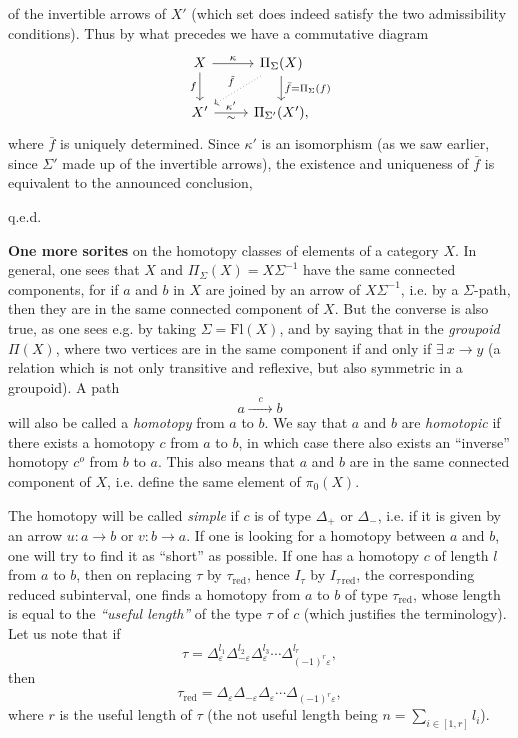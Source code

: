 \documentclass[11pt]{article}
\newcommand{\printedpage}[1]{\marginpar{\footnotesize p.~#1}}
\newcommand{\msp}[1]{\marginpar{\footnotesize [#1]}}
\newcommand{\red}{\mathrm{red}}
\begin{document}
\setcounter{footnote}{20}

\printedpage{49}
\msp{page 74}
of the invertible arrows of $X'$ (which set does indeed satisfy the two admissibility conditions). Thus by what precedes we have a commutative diagram
\[
\begin{tikzcd}
X \ar[r,"\kappa"] \ar[d,"f"'] & \Pi_{\Sigma}(X) \ar[d,"\bar f = \Pi_{\Sigma}(f)"] \ar[dl,dotted,"\tilde f"'] \\
X' \ar[r,"\kappa'","\sim"'] & \Pi_{\Sigma'}(X'),
\end{tikzcd}
\]
where $\bar f$ is uniquely determined. Since $\kappa'$ is an isomorphism (as we saw earlier, since $\Sigma'$ made up of the invertible arrows), the existence and uniqueness of $\bar f$ is equivalent to the announced conclusion,

\hfill q.e.d.

\textbf{One more sorites} on the homotopy classes of elements of a category $X$. In general, one sees that $X$ and $\Pi_{\Sigma}(X) = X\Sigma^{-1}$ have the same connected components, for if
\msp{page 75}
$a$ and $b$ in $X$ are joined by an arrow of $X\Sigma^{-1}$, i.e. by a $\Sigma$-path, then they are in the same connected component of $X$. But the converse is also true, as one sees e.g. by taking $\Sigma = \mathrm{Fl}(X)$, and by saying that in the \textit{groupoid} $\Pi(X)$, where two vertices are in the same component if and only if $\exists\ x \longrightarrow y$ (a relation which is not only transitive and reflexive, but also symmetric in a groupoid). A path
\[
a \xrightarrow{\quad c \quad} b
\]
will also be called a \textit{homotopy} from $a$ to $b$. We say that $a$ and $b$ are \textit{homotopic} if there exists a homotopy $c$ from $a$ to $b$, in which case there also exists an ``inverse'' homotopy $c^{o}$ from $b$ to $a$. This also means that $a$ and $b$ are in the same connected component of $X$, i.e. define the same element of $\pi_0(X)$.

The homotopy will be called \textit{simple} if $c$ is of type $\Delta_{+}$ or $\Delta_{-}$, i.e. if it is given by an arrow $u : a \longrightarrow b$ or $v : b \longrightarrow a$. If one is looking for a homotopy between $a$ and $b$, one will try to find it as ``short'' as possible. If one has a homotopy $c$ of length $l$ from $a$ to $b$, then on replacing $\tau$ by $\tau_{\red}$, hence $I_{\tau}$ by $I_{\tau\,\red}$, the corresponding reduced
\msp{page 76}
subinterval, one finds a homotopy from $a$ to $b$ of type $\tau_{\red}$, whose length is equal to the \textit{``useful length''} of the type $\tau$ of $c$ (which justifies the terminology). Let us note that if
\[
\tau = \Delta_{\varepsilon}^{l_1}\Delta_{-\varepsilon}^{l_2}\Delta_{\varepsilon}^{l_3}\cdots\Delta_{(-1)^{r}\varepsilon}^{l_r},
\]
then
\[
\tau_{\red} = \Delta_{\varepsilon}\Delta_{-\varepsilon}\Delta_{\varepsilon}\cdots\Delta_{(-1)^{r}\varepsilon},
\]
\printedpage{50}
 where $r$ is the useful length of $\tau$ (the not useful length being $n = \sum\limits_{i\in[1,r]} l_i$).
\end{document}
